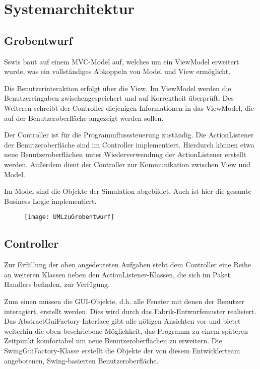 \section{Systemarchitektur}

\subsection{Grobentwurf}

Sswis baut auf einem MVC-Model auf, welches um ein ViewModel erweitert wurde, was ein vollständiges Abkoppeln von Model und View ermöglicht.

Die Benutzerinteraktion erfolgt über die View. Im ViewModel werden die Benutzereingaben zwischengespeichert und auf Korrektheit überprüft. Des Weiteren schreibt der Controller diejenigen Informationen in das ViewModel, die auf der Benutzeroberfläche angezeigt werden sollen.

Der Controller ist für die Programmflusssteuerung zuständig. Die ActionListener der Benutzeroberfläche sind im Controller implementiert. Hierdurch können etwa neue Benutzeroberflächen unter Wiederverwendung der ActionListener erstellt werden.
Außerdem dient der Controller zur Kommunikation zwischen View und Model.

Im Model sind die Objekte der Simulation abgebildet. Auch ist hier die gesamte Business Logic implementiert.

\begin{figure}[H] 
  \centering
     \texttt{[image: UMLzuGrobentwurf]}
\end{figure}

\subsection{Controller}

\noindent
{}

Zur Erfüllung der oben angedeuteten Aufgaben steht dem Controller eine Reihe an weiteren Klassen neben den ActionListener-Klassen, die sich im Paket Handlers befinden, zur Verfügung.

Zum einen müssen die GUI-Objekte, d.h. alle Fenster mit denen der Benutzer interagiert, erstellt werden. Dies wird durch das Fabrik-Entwurfsmuster realisiert. Das AbstractGuiFactory-Interface gibt alle nötigen Ansichten vor und bietet weiterhin die oben beschriebene Möglichkeit, das Programm zu einem späteren Zeitpunkt komfortabel um neue Benutzeroberflächen zu erweitern.
Die SwingGuiFactory-Klasse erstellt die Objekte der von diesem Entwicklerteam angebotenen, Swing-basierten Benutzeroberfläche.

